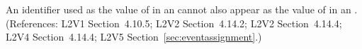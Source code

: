 An identifier used as the value of  in an \EventAssignment
cannot also appear as the value of  in an \AssignmentRule.
(References: L2V1 Section~4.10.5; L2V2 Section~4.14.2; L2V2 Section~4.14.4; L2V4 Section~4.14.4;
L2V5 Section~\ref{sec:eventassignment}.)
